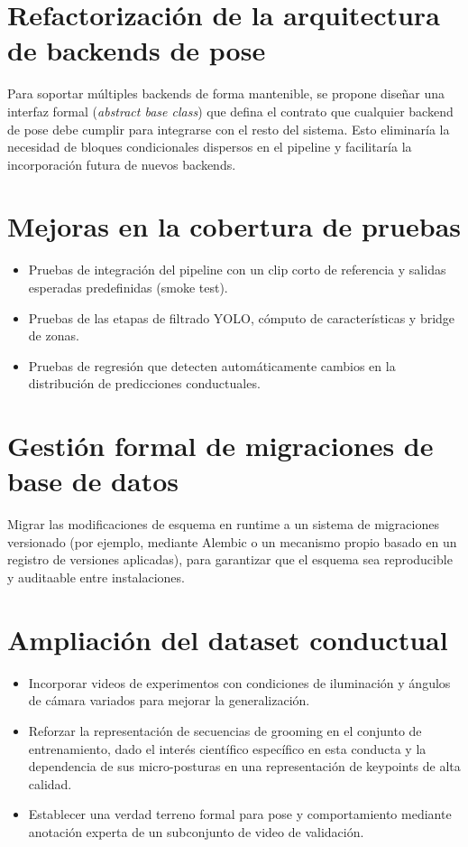 \documentclass[12pt]{report}
\begin{document}
\section{Refactorización de la arquitectura de backends de pose}

Para soportar múltiples backends de forma mantenible, se propone diseñar una
interfaz formal (\textit{abstract base class}) que defina el contrato que
cualquier backend de pose debe cumplir para integrarse con el resto del sistema.
Esto eliminaría la necesidad de bloques condicionales dispersos en el pipeline
y facilitaría la incorporación futura de nuevos backends.

\section{Mejoras en la cobertura de pruebas}

\begin{itemize}[leftmargin=*]
    \item Pruebas de integración del pipeline con un clip corto de referencia
          y salidas esperadas predefinidas (smoke test).
    \item Pruebas de las etapas de filtrado YOLO, cómputo de características
          y bridge de zonas.
    \item Pruebas de regresión que detecten automáticamente cambios en la
          distribución de predicciones conductuales.
\end{itemize}

\section{Gestión formal de migraciones de base de datos}

Migrar las modificaciones de esquema en runtime a un sistema de migraciones
versionado (por ejemplo, mediante Alembic o un mecanismo propio basado en
un registro de versiones aplicadas), para garantizar que el esquema sea
reproducible y auditaable entre instalaciones.

\section{Ampliación del dataset conductual}

\begin{itemize}[leftmargin=*]
    \item Incorporar videos de experimentos con condiciones de iluminación
          y ángulos de cámara variados para mejorar la generalización.
    \item Reforzar la representación de secuencias de grooming en el conjunto
          de entrenamiento, dado el interés científico específico en esta conducta
          y la dependencia de sus micro-posturas en una representación de keypoints
          de alta calidad.
    \item Establecer una verdad terreno formal para pose y comportamiento
          mediante anotación experta de un subconjunto de video de validación.
\end{itemize}
\end{document}
